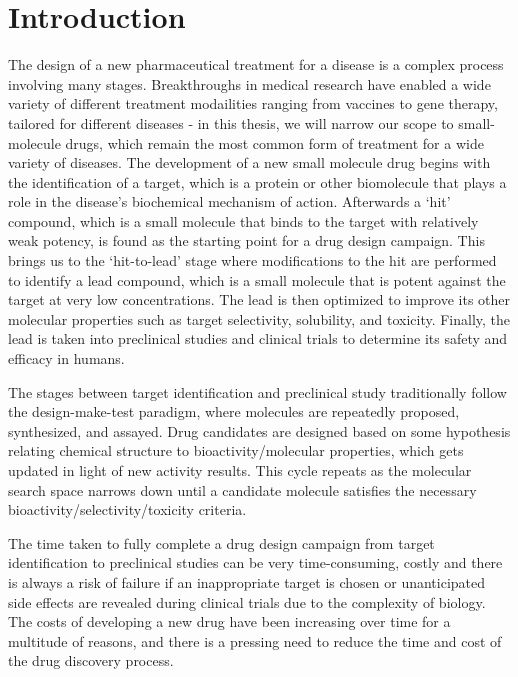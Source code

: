 \chapter{Introduction} \label{ch:intro}

The design of a new pharmaceutical treatment for a disease is a complex process involving many stages. Breakthroughs in medical research have enabled a wide variety of different treatment modailities ranging from vaccines to gene therapy, tailored for different diseases - in this thesis, we will narrow our scope to small-molecule drugs, which remain the most common form of treatment for a wide variety of diseases. The development of a new small molecule drug begins with the identification of a target, which is a protein or other biomolecule that plays a role in the disease's biochemical mechanism of action. Afterwards a `hit' compound, which is a small molecule that binds to the target with relatively weak potency, is found as the starting point for a drug design campaign. This brings us to the `hit-to-lead' stage where modifications to the hit are performed to identify a lead compound, which is a small molecule that is potent against the target at very low concentrations. The lead is then optimized to improve its other molecular properties such as target selectivity, solubility, and toxicity. Finally, the lead is taken into preclinical studies and clinical trials to determine its safety and efficacy in humans.

The stages between target identification and preclinical study traditionally follow the design-make-test paradigm, where molecules are repeatedly proposed, synthesized, and assayed. Drug candidates are designed based on some hypothesis relating chemical structure to bioactivity/molecular properties, which gets updated in light of new activity results. This cycle repeats as the molecular search space narrows down until a candidate molecule satisfies the necessary bioactivity/selectivity/toxicity criteria.

The time taken to fully complete a drug design campaign from target identification to preclinical studies can be very time-consuming, costly and there is always a risk of failure if an inappropriate target is chosen or unanticipated side effects are revealed during clinical trials due to the complexity of biology. The costs of developing a new drug have been increasing over time for a multitude of reasons, and there is a pressing need to reduce the time and cost of the drug discovery process.

